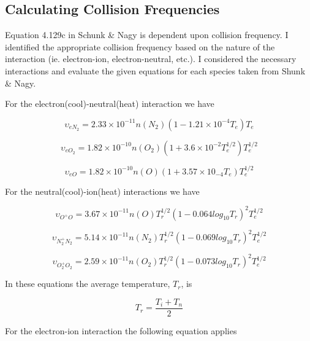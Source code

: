 \documentclass[10pt]{article}
\begin{document}
\subsection{Calculating Collision Frequencies}
Equation 4.129c in Schunk \& Nagy is dependent upon collision frequency. I identified the appropriate collision frequency based on the nature of the interaction (ie. electron-ion, electron-neutral, etc.). I considered the necessary interactions and evaluate the given equations for each species taken from Shunk \& Nagy.

\noindent For the electron(cool)-neutral(heat) interaction we have

\begin{equation}
\upsilon _{eN_{2}} = 2.33\times 10^{-11}n(N_{2})(1-1.21\times 10^{-4}T_{e})T_{e}
\end{equation}


\begin{equation}
\upsilon _{eO_{2}} = 1.82\times 10^{-10}n(O_{2})(1+3.6\times 10^{-2}T_{e}^{1/2})T_{e}^{1/2}
\end{equation}


\begin{equation}
\upsilon _{eO} = 1.82\times 10^{-10}n(O)(1+3.57\times 10_{-4}T_{e})T_{e}^{1/2}
\end{equation}

\noindent For the neutral(cool)-ion(heat) interactions we have


\begin{equation}
\upsilon _{O^{+}O} = 3.67\times 10^{-11}n(O)T_{r}^{1/2}(1-0.064log_{10}T_{r})^{2}T_{e}^{1/2}
\end{equation}


\begin{equation}
\upsilon _{N_{2}^{+}N_{2}} = 5.14\times 10^{-11}n(N_{2})T_{r}^{1/2}(1-0.069log_{10}T_{r})^{2}T_{e}^{1/2}
\end{equation}


\begin{equation}
\upsilon _{O_{2}^{+}O_{2}} = 2.59 \times 10^{-11}n(O_{2})T_{r}^{1/2}(1-0.073log_{10}T_{r})^{2}T_{e}^{1/2}
\end{equation}


\noindent In these equations the average temperature, $T_{r}$, is

\begin{equation}
T_{r}= \frac{T_{i} + T_{n}}{2}
\end{equation}

\noindent For the electron-ion interaction the following equation applies
\end{document}
